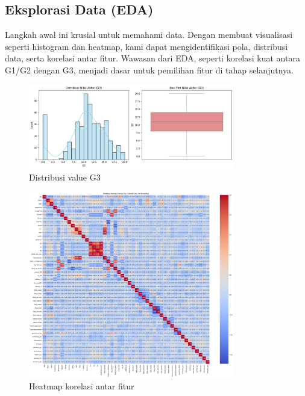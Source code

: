 \subsection{Eksplorasi Data (EDA)}
Langkah awal ini krusial untuk memahami data. Dengan membuat visualisasi seperti histogram dan heatmap, kami dapat mengidentifikasi pola, distribusi data, serta korelasi antar fitur. Wawasan dari EDA, seperti korelasi kuat antara G1/G2 dengan G3, menjadi dasar untuk pemilihan fitur di tahap selanjutnya.
\begin{figure}[h!]
    \centering
    \includegraphics[width=0.8\textwidth]{images/G3Dist.png}
    \caption{Distribusi value G3}
\end{figure}
\begin{figure}[h!]
    \centering
    \includegraphics[width=0.8\textwidth]{images/Heatmap.png}
    \caption{Heatmap korelasi antar fitur}
\end{figure}

